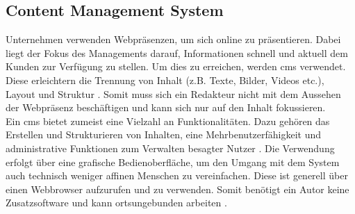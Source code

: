 \subsection{Content Management System}
Unternehmen verwenden Webpräsenzen, um sich online zu präsentieren. Dabei liegt der Fokus des Managements darauf, Informationen schnell und aktuell dem Kunden zur Verfügung zu stellen. Um dies zu erreichen, werden \acf{cms} verwendet. Diese erleichtern die Trennung von Inhalt (z.B. Texte, Bilder, Videos etc.), Layout und Struktur \cite[S.1 ff.]{spo09}. Somit muss sich ein Redakteur nicht mit dem Aussehen der Webpräsenz beschäftigen und kann sich nur auf den Inhalt fokussieren. \\
Ein \ac{cms} bietet zumeist eine Vielzahl an Funktionalitäten. Dazu gehören das Erstellen und Strukturieren von Inhalten, eine Mehrbenutzerfähigkeit und administrative Funktionen zum Verwalten besagter Nutzer \cite[S. 55]{spo09}.  Die Verwendung erfolgt über eine grafische Bedienoberfläche, um den Umgang mit dem System auch technisch weniger affinen Menschen zu vereinfachen. Diese ist generell über einen Webbrowser aufzurufen und zu verwenden. Somit benötigt ein Autor keine Zusatzsoftware und kann ortsungebunden arbeiten \cite[S. 19 f.]{bon11}.

